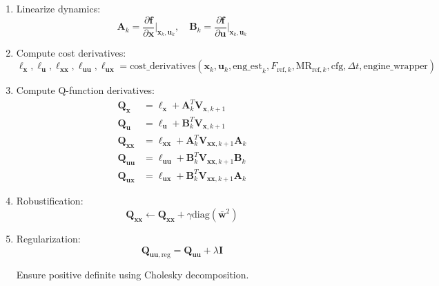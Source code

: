 \documentclass[11pt,a4paper]{article}
\begin{document}
\begin{enumerate}
    \item Linearize dynamics:
    \begin{equation}
    \mathbf{A}_k = \frac{\partial \mathbf{f}}{\partial \mathbf{x}}\Big|_{\mathbf{x}_k, \mathbf{u}_k}, \quad \mathbf{B}_k = \frac{\partial \mathbf{f}}{\partial \mathbf{u}}\Big|_{\mathbf{x}_k, \mathbf{u}_k}
    \end{equation}
    
    \item Compute cost derivatives:
    \begin{equation}
    \ell_{\mathbf{x}}, \ell_{\mathbf{u}}, \ell_{\mathbf{xx}}, \ell_{\mathbf{uu}}, \ell_{\mathbf{ux}} = \text{cost\_derivatives}(\mathbf{x}_k, \mathbf{u}_k, \text{eng\_est}_k, F_{\text{ref},k}, \text{MR}_{\text{ref},k}, \text{cfg}, \Delta t, \text{engine\_wrapper})
    \end{equation}
    
    \item Compute Q-function derivatives:
    \begin{align}
    \mathbf{Q}_{\mathbf{x}} &= \ell_{\mathbf{x}} + \mathbf{A}_k^T \mathbf{V}_{\mathbf{x},k+1} \\
    \mathbf{Q}_{\mathbf{u}} &= \ell_{\mathbf{u}} + \mathbf{B}_k^T \mathbf{V}_{\mathbf{x},k+1} \\
    \mathbf{Q}_{\mathbf{xx}} &= \ell_{\mathbf{xx}} + \mathbf{A}_k^T \mathbf{V}_{\mathbf{xx},k+1} \mathbf{A}_k \\
    \mathbf{Q}_{\mathbf{uu}} &= \ell_{\mathbf{uu}} + \mathbf{B}_k^T \mathbf{V}_{\mathbf{xx},k+1} \mathbf{B}_k \\
    \mathbf{Q}_{\mathbf{ux}} &= \ell_{\mathbf{ux}} + \mathbf{B}_k^T \mathbf{V}_{\mathbf{xx},k+1} \mathbf{A}_k
    \end{align}
    
    \item Robustification:
    \begin{equation}
    \mathbf{Q}_{\mathbf{xx}} \leftarrow \mathbf{Q}_{\mathbf{xx}} + \gamma \text{diag}(\bar{\mathbf{w}}^2)
    \end{equation}
    
    \item Regularization:
    \begin{equation}
    \mathbf{Q}_{\mathbf{uu},\text{reg}} = \mathbf{Q}_{\mathbf{uu}} + \lambda \mathbf{I}
    \end{equation}
    
    Ensure positive definite using Cholesky decomposition.
    

\end{enumerate}
\end{document}
